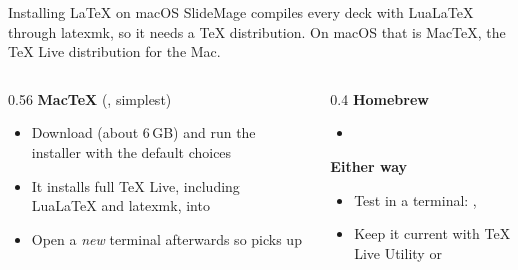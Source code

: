 
\begin{standardframe}{Installing LaTeX on macOS}
	\small
	SlideMage compiles every deck with LuaLaTeX through latexmk, so it needs a
	TeX distribution. On macOS that is MacTeX, the TeX Live distribution for the Mac.
	\par\medskip
	\begin{columns}[T,onlytextwidth]
		\begin{column}{0.56\linewidth}
			\textbf{MacTeX} (, simplest)
			\begin{itemize}
				\item Download  (about 6\,GB) and run the installer with the default choices
				\item It installs full TeX Live, including LuaLaTeX and latexmk, into 
				\item Open a \emph{new} terminal afterwards so  picks up 
			\end{itemize}
		\end{column}
		\begin{column}{0.4\linewidth}
			\textbf{Homebrew}
			\begin{itemize}
				\item {}
			\end{itemize}
			\medskip
			\textbf{Either way}
			\begin{itemize}
				\item Test in a terminal: , 
				\item Keep it current with TeX Live Utility or 
			\end{itemize}
		\end{column}
	\end{columns}
\end{standardframe}
